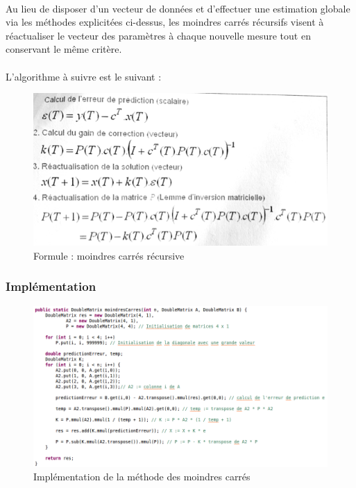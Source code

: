\documentclass[a4paper,11pt]{article}
\begin{document}
			\paragraph{}
			Au lieu de disposer d’un vecteur de données et d’effectuer une estimation globale via les méthodes explicitées ci-dessus, les moindres carrés récursifs visent à réactualiser le vecteur des paramètres à chaque nouvelle mesure tout en conservant le même critère.

			\paragraph{}
			L’algorithme à suivre est le suivant :

			\begin{figure}[h]
				\centerline{\includegraphics[scale=0.50]{img/moindres_carres_rec.png}}
				\caption{Formule : moindres carrés récursive}
				\label{diagramme-composants}
			\end{figure}

			\subsubsection{Implémentation}

			\begin{figure}[h]
				\centerline{\includegraphics[scale=0.50]{img/moindresCarres.png}}
				\caption{Implémentation de la méthode des moindres carrés}
				\label{diagramme-composants}
			\end{figure}
\end{document}
